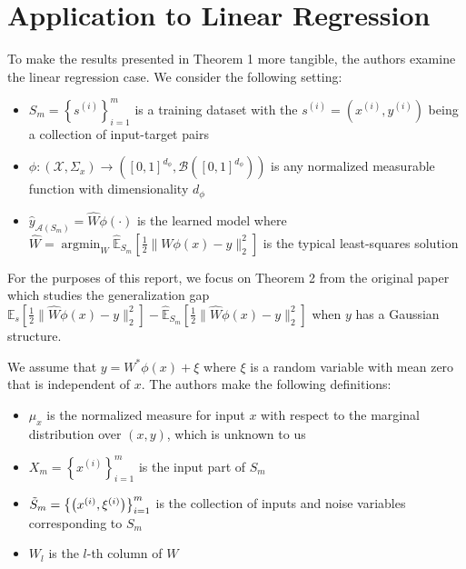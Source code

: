 \documentclass{article}
\DeclareMathOperator*{\argmin}{argmin}
\begin{document}
\section{Application to Linear Regression}
To make the results presented in Theorem 1 more tangible, the authors examine the linear regression case. We consider the following setting:
\begin{itemize}
    \item $S_m = \left\{s^{(i)} \right\}_{i=1}^{m}$ is a training dataset with the $s^{(i)} = \left(x^{(i)}, y^{(i)} \right)$ being a collection of input-target pairs

    \item $\phi: \left(\mathcal{X}, \Sigma_x \right) \rightarrow \left([0, 1]^{d_{\phi}}, \mathcal{B}\left([0, 1]^{d_\phi} \right) \right)$ is any normalized measurable function with dimensionality $d_{\phi}$

    \item $\hat{y}_{\mathcal{A}(S_m)} = \hat{W} \phi(\cdot)$ is the learned model where $\hat{W} = \argmin_{W} \hat{\mathbb{E}}_{S_m} \left[\frac{1}{2} \lVert W \phi(x) - y \rVert_{2}^{2} \right]$ is the typical least-squares solution
\end{itemize}
For the purposes of this report, we focus on Theorem 2 from the original paper which studies the generalization gap $\mathbb{E}_{s} \left[ \frac{1}{2} \lVert \hat{W} \phi(x) - y \rVert_{2}^{2} \right] - \hat{\mathbb{E}}_{S_m} \left[ \frac{1}{2} \lVert \hat{W} \phi(x) - y \rVert_{2}^{2} \right]$ when $y$ has a Gaussian structure. 

We assume that $y = W^* \phi(x) + \xi$ where $\xi$ is a random variable with mean zero that is independent of $x$. The authors make the following definitions:
\begin{itemize}
    \item $\mu_x$ is the normalized measure for input $x$ with respect to the marginal distribution over $(x, y)$, which is unknown to us

    \item $X_m = \left\{x^{(i)} \right\}_{i=1}^{m}$ is the input part of $S_m$

    \item $\Tilde{S}_{m} = \left\{\left(x^{(i)}, \xi^{(i)} \right) \right\}_{i=1}^{m}$ is the collection of inputs and noise variables corresponding to $S_{m}$

    \item $W_{l}$ is the $l$-th column of $W$
\end{itemize}
\end{document}
